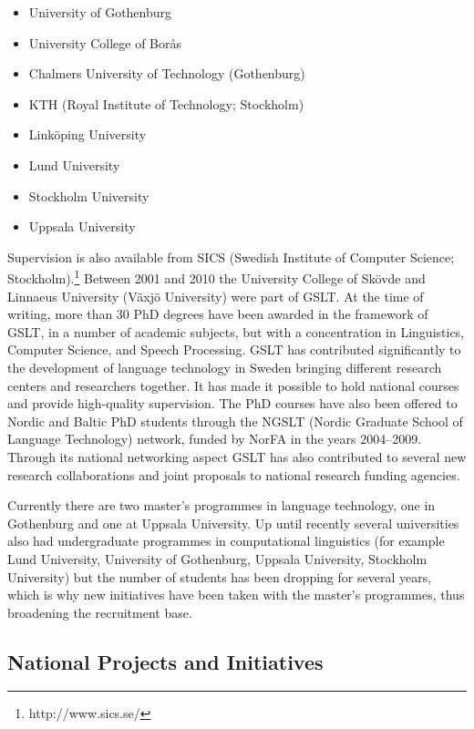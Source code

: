 \begin{multicols}{2}
\begin{itemize}[itemsep=0pt,parsep=0pt]
\item University of Gothenburg
\item University College of Borås
\item Chalmers University of Technology (Gothenburg)
\item KTH (Royal Institute of Technology; Stockholm)
\item Linköping University
\item Lund University
\item Stockholm University
\item Uppsala University
\end{itemize}

Supervision is also available from SICS (Swedish Institute of Computer
Science; Stockholm).\footnote{http://www.sics.se/} Between 2001 and
2010 the University College of Skövde and Linnaeus University (Växjö
University) were part of GSLT. At the time of writing, more than 30
PhD degrees have been awarded in the framework of GSLT, in a number of
academic subjects, but with a concentration in Linguistics, Computer
Science, and Speech Processing. GSLT has contributed significantly to
the development of language technology in Sweden bringing different
research centers and researchers together. It has made it possible to
hold national courses and provide high-quality supervision. The PhD
courses have also been offered to Nordic and Baltic PhD students
through the NGSLT (Nordic Graduate School of Language Technology)
network, funded by NorFA in the years 2004–2009. Through its national
networking aspect GSLT has also contributed to several new research
collaborations and joint proposals to national research funding
agencies.

Currently there are two master’s programmes in language technology,
one in Gothenburg and one at Uppsala University. Up until recently
several universities also had undergraduate programmes in
computational linguistics (for example Lund University, University of
Gothenburg, Uppsala University, Stockholm University) but the number
of students has been dropping for several years, which is why new
initiatives have been taken with the master's programmes, thus
broadening the recruitment base.

\subsection{National Projects and Initiatives}


\end{multicols}
